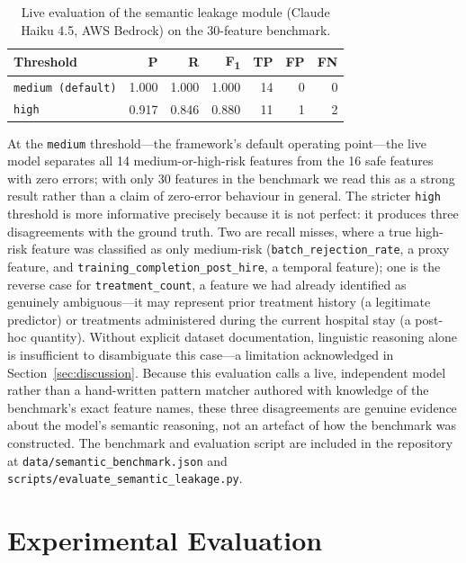 \documentclass[11pt]{article}
\begin{document}
\begin{table}[!h]
\centering
\caption{Live evaluation of the semantic leakage module (Claude Haiku 4.5,
  AWS Bedrock) on the 30-feature benchmark.}
\label{tab:semantic_eval}
\scriptsize
\begin{tabular}{lrrrrrr}
\toprule
\textbf{Threshold} & \textbf{P} & \textbf{R} & \textbf{F\textsubscript{1}} & \textbf{TP} & \textbf{FP} & \textbf{FN} \\
\midrule
\texttt{medium (default)} & 1.000 & 1.000 & 1.000 & 14 & 0 & 0 \\
\texttt{high}             & 0.917 & 0.846 & 0.880 & 11 & 1 & 2 \\
\bottomrule
\end{tabular}
\end{table}

At the \texttt{medium} threshold---the framework's default operating
point---the live model separates all 14 medium-or-high-risk features from
the 16 safe features with zero errors; with only 30 features in the
benchmark we read this as a strong result rather than a claim of zero-error
behaviour in general.  The stricter \texttt{high} threshold is more
informative precisely because it is not perfect: it produces three
disagreements with the ground truth.  Two are recall misses, where a true
high-risk feature was classified as only medium-risk
(\texttt{batch\_rejection\_rate}, a proxy feature, and
\texttt{training\_completion\_post\_hire}, a temporal feature); one is the
reverse case for \texttt{treatment\_count}, a feature we had already
identified as genuinely ambiguous---it may represent
prior treatment history (a legitimate predictor) or treatments administered
during the current hospital stay (a post-hoc quantity).  Without explicit
dataset documentation, linguistic reasoning alone is insufficient to
disambiguate this case---a limitation acknowledged in Section~\ref{sec:discussion}.
Because this evaluation calls a live, independent model rather than a
hand-written pattern matcher authored with knowledge of the benchmark's
exact feature names, these three disagreements are genuine evidence about
the model's semantic reasoning, not an artefact of how the benchmark was
constructed.
The benchmark and evaluation script are included in the repository at
\texttt{data/semantic\_benchmark.json} and
\texttt{scripts/evaluate\_semantic\_leakage.py}.

\section{Experimental Evaluation}
\label{sec:experiments}
\end{document}
